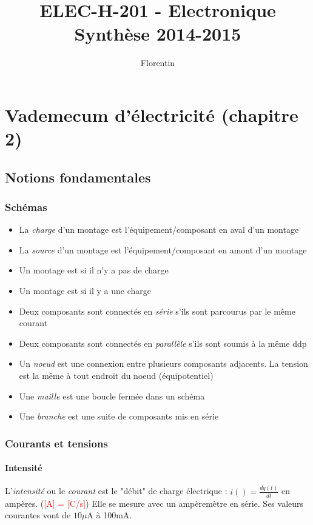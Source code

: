 \documentclass[a4paper]{article}
\title{
    ELEC-H-201 - Electronique\\
    \small Synthèse 2014-2015
}
\author{Florentin \bsc{Hennecker}}
\date{}
\begin{document}
\maketitle
\tableofcontents

\section{Vademecum d'électricité (chapitre 2)}

    \subsection{Notions fondamentales}

    \subsubsection{Schémas}
    \begin{itemize}
        \item La \textit{charge} d'un montage est l'équipement/composant en aval d'un montage
        \item La \textit{source} d'un montage est l'équipement/composant en amont d'un montage
        \item Un montage est  si il n'y a pas de charge
        \item Un montage est  si il y a une charge
        \item Deux composants sont connectés en \textit{série} s'ils sont parcourus par le même courant
        \item Deux composants sont connectés en \textit{parallèle} s'ils sont soumis à la même ddp
        \item Un \textit{noeud} est une connexion entre plusieurs composants adjacents. La tension est la même à tout endroit du noeud (équipotentiel)
        \item Une \textit{maille} est une boucle fermée dans un schéma
        \item Une \textit{branche} est une suite de composants mis en série
    \end{itemize}

    \subsubsection{Courants et tensions}

    \paragraph{Intensité} L'\textit{intensité} ou le \textit{courant} 
    est le "débit" de charge électrique : $i() = \frac{dq(t)}{dt}$ en ampères. 
    (\textcolor{red}{[A] = [C/s]}) Elle se mesure avec un ampèremètre en série.
    Ses valeurs courantes vont de $10\mu$A à 100mA.\\
\end{document}
